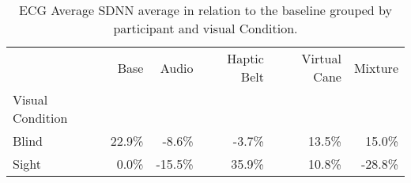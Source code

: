 
\begin{table}[!htb]
\centering
\caption{ECG Average SDNN average in relation to the baseline grouped by participant and visual Condition.}
\label{tab:ecg_sdnn_average_group}
\begin{tabular}{lrrrrr}
\toprule
{} &    Base &    Audio & Haptic Belt & Virtual Cane &  Mixture \\
Visual Condition &         &          &             &              &          \\
\midrule
Blind            &  22.9\% &   -8.6\% &      -3.7\% &       13.5\% &   15.0\% \\
Sight            &   0.0\% &  -15.5\% &      35.9\% &       10.8\% &  -28.8\% \\
\bottomrule
\end{tabular}
\end{table}

